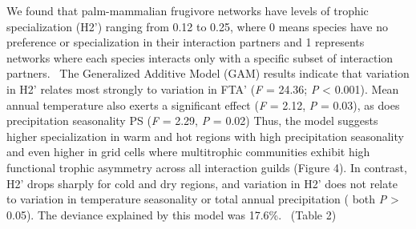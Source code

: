\documentclass[
]{agujournal2019}
\begin{document}
We found that palm-mammalian frugivore networks have levels of trophic
specialization (H2') ranging from 0.12 to 0.25, where 0 means species
have no preference or specialization in their interaction partners and 1
represents networks where each species interacts only with a specific
subset of interaction partners. ~The Generalized Additive Model (GAM)
results indicate that variation in H2' relates most strongly to
variation in FTA' (\emph{F} = 24.36; \emph{P} \textless{} 0.001). Mean
annual temperature also exerts a significant effect (\emph{F} = 2.12,
\emph{P} = 0.03), as does precipitation seasonality PS (\emph{F} = 2.29,
\emph{P} = 0.02) Thus, the model suggests higher specialization in warm
and hot regions with high precipitation seasonality and even higher in
grid cells where multitrophic communities exhibit high functional
trophic asymmetry across all interaction guilds (Figure 4). In contrast,
H2' drops sharply for cold and dry regions, and variation in H2' does
not relate to variation in temperature seasonality or total annual
precipitation ( both \emph{P} \textgreater{} 0.05). The deviance
explained by this model was 17.6\%. ~(Table 2)
\end{document}
